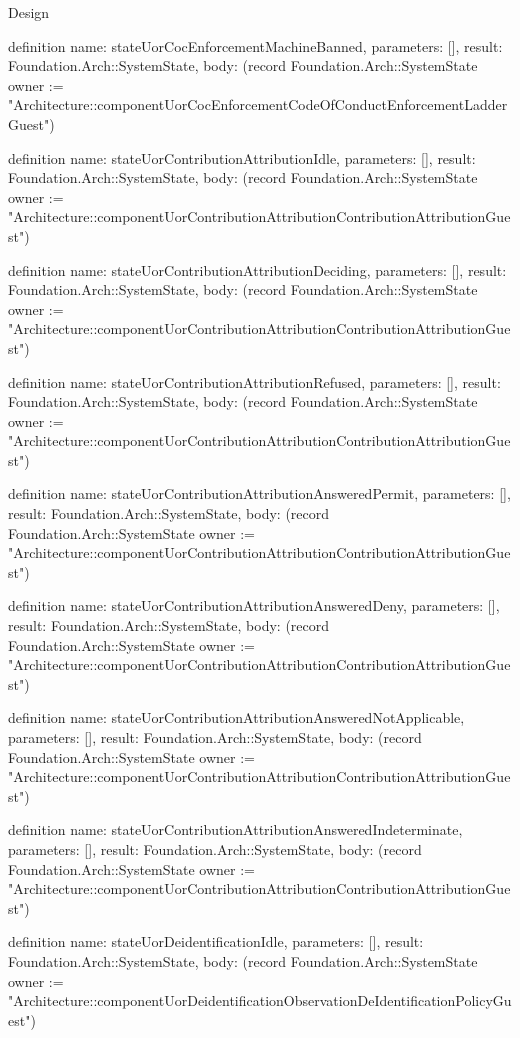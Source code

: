 \begin{lexlean}{Design}
\begin{semanticmodule}
definition{
  name: stateUorCocEnforcementMachineBanned,
  parameters: [],
  result: Foundation.Arch::SystemState,
  body: (record Foundation.Arch::SystemState {owner := "Architecture::componentUorCocEnforcementCodeOfConductEnforcementLadderGuest"})
}

definition{
  name: stateUorContributionAttributionIdle,
  parameters: [],
  result: Foundation.Arch::SystemState,
  body: (record Foundation.Arch::SystemState {owner := "Architecture::componentUorContributionAttributionContributionAttributionGuest"})
}

definition{
  name: stateUorContributionAttributionDeciding,
  parameters: [],
  result: Foundation.Arch::SystemState,
  body: (record Foundation.Arch::SystemState {owner := "Architecture::componentUorContributionAttributionContributionAttributionGuest"})
}

definition{
  name: stateUorContributionAttributionRefused,
  parameters: [],
  result: Foundation.Arch::SystemState,
  body: (record Foundation.Arch::SystemState {owner := "Architecture::componentUorContributionAttributionContributionAttributionGuest"})
}

definition{
  name: stateUorContributionAttributionAnsweredPermit,
  parameters: [],
  result: Foundation.Arch::SystemState,
  body: (record Foundation.Arch::SystemState {owner := "Architecture::componentUorContributionAttributionContributionAttributionGuest"})
}

definition{
  name: stateUorContributionAttributionAnsweredDeny,
  parameters: [],
  result: Foundation.Arch::SystemState,
  body: (record Foundation.Arch::SystemState {owner := "Architecture::componentUorContributionAttributionContributionAttributionGuest"})
}

definition{
  name: stateUorContributionAttributionAnsweredNotApplicable,
  parameters: [],
  result: Foundation.Arch::SystemState,
  body: (record Foundation.Arch::SystemState {owner := "Architecture::componentUorContributionAttributionContributionAttributionGuest"})
}

definition{
  name: stateUorContributionAttributionAnsweredIndeterminate,
  parameters: [],
  result: Foundation.Arch::SystemState,
  body: (record Foundation.Arch::SystemState {owner := "Architecture::componentUorContributionAttributionContributionAttributionGuest"})
}

definition{
  name: stateUorDeidentificationIdle,
  parameters: [],
  result: Foundation.Arch::SystemState,
  body: (record Foundation.Arch::SystemState {owner := "Architecture::componentUorDeidentificationObservationDeIdentificationPolicyGuest"})
}


\end{semanticmodule}
\end{lexlean}
